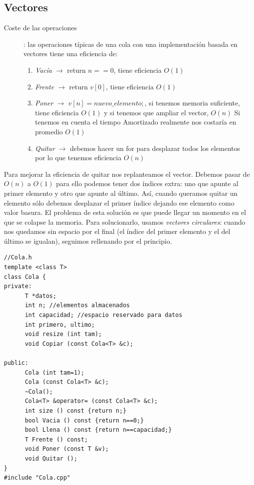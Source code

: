 \documentclass[10pt,a4paper,spanish]{report}
\begin{document}
\subsection{\textcolor[rgb]{0.2,0.5,0.5}Vectores}
\begin{description}
\item[Coste de las operaciones]: las operaciones típicas de una cola con una implementación basada en vectores tiene una eficiencia de:
\begin{enumerate}[$\bullet$]
\item \textit{\textcolor[rgb]{0.2,0.5,0.5}{Vacía}} $\longrightarrow$ return $n==0$, tiene eficiencia $O(1)$
\item \textit{\textcolor[rgb]{0.2,0.5,0.5}{Frente}} $\longrightarrow$ return $v[0]$, tiene eficiencia $O(1)$
\item \textit{\textcolor[rgb]{0.2,0.5,0.5}{Poner}} $\longrightarrow$ $v[n] = nuevo\_elemento;$, si tenemos memoria suficiente, tiene eficiencia $O(1)$ y si tenemos que ampliar el vector, $O(n)$ 
Si tenemos en cuenta el tiempo Amortizado realmente nos costaría en promedio $O(1)$
\item \textit{\textcolor[rgb]{0.2,0.5,0.5}{Quitar}} $\longrightarrow$ debemos hacer un for para desplazar todos los elementos por lo que tenemos eficiencia $O(n)$

\end{enumerate}
\end{description}

\noindent
Para mejorar la eficiencia de quitar nos replanteamos el vector. Debemos pasar de $O(n)$ a $O(1)$ para ello podemos tener dos índices extra: uno que apunte al primer elemento y otro que apunte al último. Así, cuando queramos quitar un elemento sólo debemos desplazar el primer índice dejando ese elemento como valor basura. El problema de esta solución es que puede llegar un momento en el que se colapse la memoria. Para solucionarlo, usamos \textit{\textcolor[rgb]{0.2,0.5,0.5}{vectores circulares}}: cuando nos quedamos sin espacio por el final (el índice del primer elemento y el del último se igualan), seguimos rellenando por el principio.

\begin{verbatim}
//Cola.h
template <class T>
class Cola {
private:
      T *datos;
      int n; //elementos almacenados
      int capacidad; //espacio reservado para datos
      int primero, ultimo;
      void resize (int tam);
      void Copiar (const Cola<T> &c);

public:
      Cola (int tam=1);
      Cola (const Cola<T> &c);
      ~Cola();
      Cola<T> &operator= (const Cola<T> &c);
      int size () const {return n;}
      bool Vacia () const {return n==0;}
      bool Llena () const {return n==capacidad;}
      T Frente () const;
      void Poner (const T &v);
      void Quitar ();
}
#include "Cola.cpp"
\end{verbatim}
\end{document}
